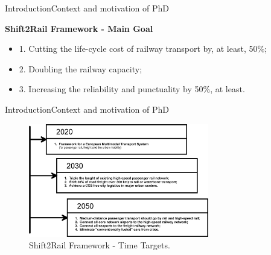 
\begin{frame}{Introduction}{Context and motivation of PhD}
\begin{block}{\textbf{Shift2Rail Framework - Main Goal}}
	\begin{itemize}
		\item 1. Cutting the life-cycle cost of railway transport by, at least, 50\%;
		\item 2. Doubling the railway capacity;
		\item 3. Increasing the reliability and punctuality by 50\%, at least.
	\end{itemize}
	
\end{block}
\end{frame}

\begin{frame}{Introduction}{Context and motivation of PhD}
\begin{figure}[ht!]
	\centering
	\includegraphics[width=0.7\textwidth,keepaspectratio]{figures/1.Intro/time_targets}
	\caption{Shift2Rail Framework - Time Targets. \cite{shift2rail2015}}
\end{figure}

\end{frame}





